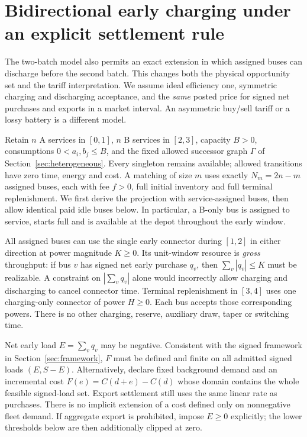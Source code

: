 \section{Bidirectional early charging under an explicit settlement rule}
\label{sec:v2g}
The two-batch model also permits an exact extension in which assigned buses
can discharge before the second batch. This changes both the physical
opportunity set and the tariff interpretation. We assume ideal efficiency
one, symmetric charging and discharging acceptance, and the \emph{same}
posted price for signed net purchases and exports in a market interval.
An asymmetric buy/sell tariff or a lossy battery is a different model.

Retain $n$ A services in $[0,1]$, $n$ B services in $[2,3]$, capacity
$B>0$, consumptions $0<a_i,b_j\le B$, and the fixed allowed successor
graph $\Gamma$ of Section~\ref{sec:heterogeneous}. Every singleton remains
available; allowed transitions have zero time, energy and cost. A matching
of size $m$ uses exactly $N_m=2n-m$ assigned buses, each with fee $f>0$,
full initial inventory and full terminal replenishment. We first derive
the projection with service-assigned buses, then allow identical paid idle
buses below. In particular, a B-only bus is assigned to service,
starts full and is available at the depot throughout the early window.

All assigned buses can use the single early connector during $[1,2]$ in
either direction at power magnitude $K\ge0$. Its unit-window resource is
\emph{gross} throughput: if bus $v$ has signed net early purchase $q_v$,
then $\sum_v|q_v|\le K$ must be realizable. A constraint on $|\sum_vq_v|$
alone would incorrectly allow charging and discharging to cancel connector
time. Terminal replenishment in $[3,4]$ uses one charging-only connector
of power $H\ge0$. Each bus accepts those corresponding powers. There
is no other charging, reserve, auxiliary draw, taper or switching time.

Net early load $E=\sum_vq_v$ may be negative. Consistent with the signed
framework in Section~\ref{sec:framework}, $F$ must be defined and finite on all admitted signed
loads $(E,S-E)$. Alternatively, declare fixed background demand and an
incremental cost $F(e)=C(d+e)-C(d)$ whose domain contains the whole feasible
signed-load set. Export settlement still uses the same linear rate as
purchases. There is no implicit extension of a cost defined only on
nonnegative fleet demand. If aggregate export is prohibited, impose $E\ge0$
explicitly; the lower thresholds below are then additionally clipped at zero.

